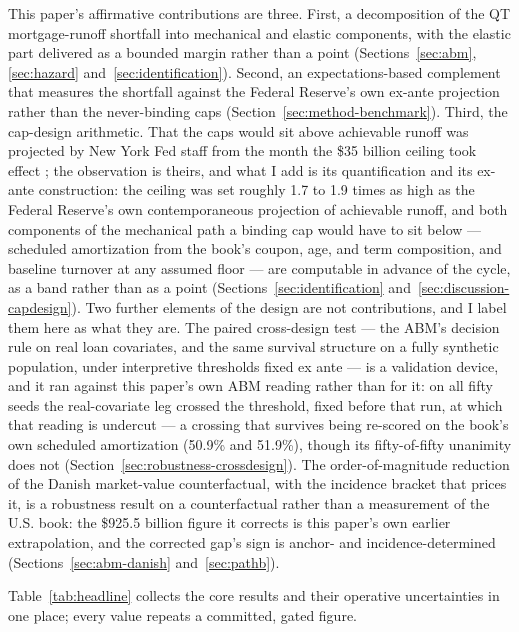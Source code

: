 \documentclass[12pt]{article}
\begin{document}
This paper's affirmative contributions are three. First, a decomposition of the QT mortgage-runoff shortfall into mechanical and elastic components, with the elastic part delivered as a bounded margin rather than a point (Sections~\ref{sec:abm}, \ref{sec:hazard} and~\ref{sec:identification}). Second, an expectations-based complement that measures the shortfall against the Federal Reserve's own ex-ante projection rather than the never-binding caps (Section~\ref{sec:method-benchmark}). Third, the cap-design arithmetic. That the caps would sit above achievable runoff was projected by New York Fed staff from the month the \$35 billion ceiling took effect \citep{nyfed2022}; the observation is theirs, and what I add is its quantification and its ex-ante construction: the ceiling was set roughly 1.7 to 1.9 times as high as the Federal Reserve's own contemporaneous projection of achievable runoff, and both components of the mechanical path a binding cap would have to sit below --- scheduled amortization from the book's coupon, age, and term composition, and baseline turnover at any assumed floor --- are computable in advance of the cycle, as a band rather than as a point (Sections~\ref{sec:identification} and~\ref{sec:discussion-capdesign}). Two further elements of the design are not contributions, and I label them here as what they are. The paired cross-design test --- the ABM's decision rule on real loan covariates, and the same survival structure on a fully synthetic population, under interpretive thresholds fixed ex ante --- is a validation device, and it ran against this paper's own ABM reading rather than for it: on all fifty seeds the real-covariate leg crossed the threshold, fixed before that run, at which that reading is undercut --- a crossing that survives being re-scored on the book's own scheduled amortization (50.9\% and 51.9\%), though its fifty-of-fifty unanimity does not (Section~\ref{sec:robustness-crossdesign}). The order-of-magnitude reduction of the Danish market-value counterfactual, with the incidence bracket that prices it, is a robustness result on a counterfactual rather than a measurement of the U.S. book: the \$925.5 billion figure it corrects is this paper's own earlier extrapolation, and the corrected gap's sign is anchor- and incidence-determined (Sections~\ref{sec:abm-danish} and~\ref{sec:pathb}).

Table~\ref{tab:headline} collects the core results and their operative uncertainties in one place; every value repeats a committed, gated figure.
\end{document}
